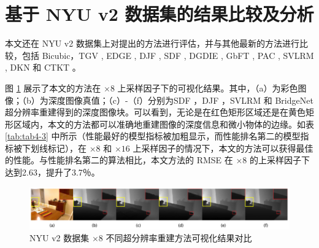 \section{基于 NYU v2 数据集的结果比较及分析}

本文还在 NYU v2 数据集上对提出的方法进行评估，并与其他最新的方法进行比较，包括 Bicubic，TGV \cite{DBLP:conf/iccv/FerstlRRRB13}, EDGE \cite{ParkKTBK11}, DJF \cite{DBLP:conf/eccv/LiHA016}, SDF \cite{DBLP:journals/pami/HamCP18}, DGDIE \cite{DBLP:conf/cvpr/GuZGCCZ17}, GbFT \cite{DBLP:conf/iccv/AlbaharH19}, PAC \cite{DBLP:conf/cvpr/SuJSGLK19}, SVLRM \cite{DBLP:conf/cvpr/PanDRLT019}, DKN \cite{DBLP:journals/corr/abs-1903-11286} 和 CTKT \cite{Sun2021cvpr}。

图 \ref{fig:fig4-4} 展示了本文的方法在 $\times 8$ 上采样因子下的可视化结果。其中，（a）为彩色图像；（b）为深度图像真值；（c）-（f）分别为SDF  \cite{DBLP:journals/pami/HamCP18}，DJF  \cite{DBLP:conf/eccv/LiHA016}，SVLRM  \cite{DBLP:conf/cvpr/PanDRLT019} 和 BridgeNet 超分辨率重建得到的深度图像块。可以看到，无论是在红色矩形区域还是在黄色矩形区域内，本文的方法都可以准确地重建图像的深度信息和微小物体的边缘。如表 \ref{tab:tab4-3} 中所示（性能最好的模型指标被加粗显示，而性能排名第二的模型指标被下划线标记），在 $\times 8$ 和 $\times 16$ 上采样因子的情况下，本文的方法可以获得最佳的性能。与性能排名第二的算法相比，本文方法的 RMSE 在 $\times 8$ 的上采样因子下达到2.63，提升了3.7％。

\begin{figure}[!htbp]
	\centering
	\includegraphics{figures/30.png}
	\caption{NYU v2 数据集 $\times 8$ 不同超分辨率重建方法可视化结果对比}
	\label{fig:fig4-4}
	\vspace{-0.8cm}  %
	\end{figure}
	
